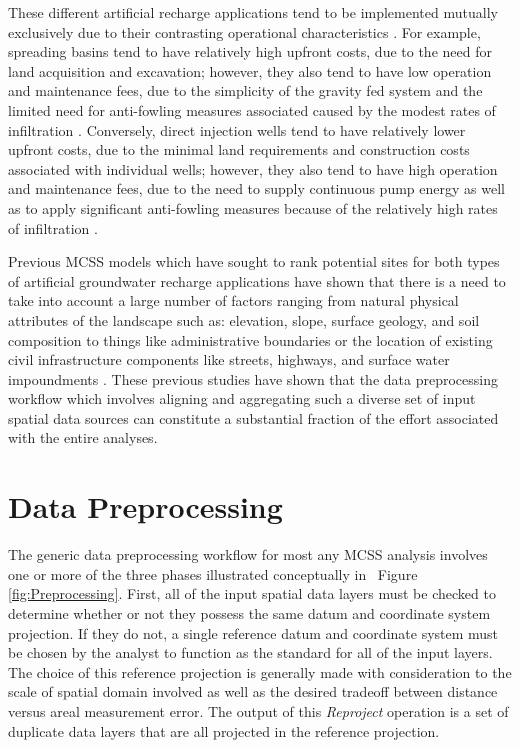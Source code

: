 These different artificial recharge applications tend to be implemented mutually exclusively due to their contrasting operational characteristics \cite{Asano1998, NRC2008, NRC2012}. For example, spreading basins tend to have relatively high upfront costs, due to the need for land acquisition and excavation; however, they also tend to have low operation and maintenance fees, due to the simplicity of the gravity fed system and the limited need for anti-fowling measures associated caused by the modest rates of infiltration \cite{Bouwer1999, Bouwer2002, Todd2005}. Conversely, direct injection wells tend to have relatively lower upfront costs, due to the minimal land requirements and construction costs associated with individual wells; however, they also tend to have high operation and maintenance fees, due to the need to supply continuous pump energy as well as to apply significant anti-fowling measures because of the relatively high rates of infiltration \cite{Pyne1995, Bouwer1999, Bouwer2002}.

Previous MCSS models which have sought to rank potential sites for both types of artificial groundwater recharge applications have shown that there is a need to take into account a large number of factors ranging from natural physical attributes of the landscape such as: elevation, slope, surface geology, and soil composition to things like administrative boundaries or the location of existing civil infrastructure components like streets, highways, and surface water impoundments \cite{Kallali2007, Ghayoumian2007, Pedrero2011, Sargaonkar2011, Albuquerque2012, Rahman2012}. These previous studies have shown that the data preprocessing workflow which involves aligning and aggregating such a diverse set of input spatial data sources can constitute a substantial fraction of the effort associated with the entire analyses. 

\section{Data Preprocessing}
    
The generic data preprocessing workflow for most any MCSS analysis involves one or more of the three phases illustrated conceptually in ~Figure \ref{fig:Preprocessing}. First, all of the input spatial data layers must be checked to determine whether or not they possess the same datum and coordinate system projection. If they do not, a single reference datum and coordinate system must be chosen by the analyst to function as the standard for all of the input layers. The choice of this reference projection is generally made with consideration to the scale of spatial domain involved as well as the desired tradeoff between distance versus areal measurement error. The output of this \textit{Reproject} operation is a set of duplicate  data layers that are all projected in the reference projection. 


